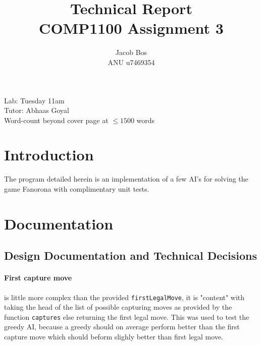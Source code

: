 \documentclass[11pt]{article}
\title{Technical Report\\ COMP1100 Assignment 3}
\author{Jacob Bos\\ ANU u7469354}
\begin{document}
\maketitle
{}
\begin{center}
  Lab: Tuesday 11am\\
  Tutor: Abhaas Goyal\\
  Word-count beyond cover page at $\leq 1500$ words
\end{center}
\tableofcontents
\newpage
{}
\section{Introduction} 
The program detailed herein is an implementation of a few AI's for solving the game Fanorona with complimentary unit tests.


\section{Documentation}%
\subsection{Design Documentation and Technical Decisions}
\paragraph*{First capture move} is little more complex than the provided \verb|firstLegalMove|, it is "content" with taking the head of the list of possible capturing moves as provided by the function \verb|captures| else returning the first legal move. This was used to test the greedy AI, because a greedy should on average perform better than the first capture move which should beform slighly better than first legal move.
\end{document}
